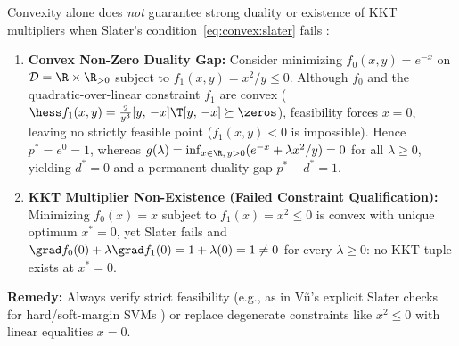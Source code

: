 \documentclass[../../../../master.tex]{subfiles}
\begin{document}
\begin{pitfall}
Convexity alone does \emph{not} guarantee strong duality or existence of KKT multipliers when Slater's condition~\eqref{eq:convex:slater} fails :
\begin{enumerate}[leftmargin=1.4em, itemsep=2pt, topsep=2pt]
  \item \textbf{Convex Non-Zero Duality Gap:} Consider minimizing $f_0(x, y) = e^{-x}$ on $\mathcal{D} = \R \times \R_{>0}$ subject to $f_1(x, y) = x^2 / y \le 0$. Although $f_0$ and the quadratic-over-linear constraint $f_1$ are convex ($\hess f_1(x,y) = \frac{2}{y^3}[y,\, -x]\T[y,\, -x] \succeq \zeros$), feasibility forces $x = 0$, leaving no strictly feasible point ($f_1(x, y) < 0$ is impossible). Hence $p^* = e^0 = 1$, whereas $g(\lambda) = \inf_{x \in \R,\, y > 0} (e^{-x} + \lambda x^2/y) = 0$ for all $\lambda \ge 0$, yielding $d^* = 0$ and a permanent duality gap $p^* - d^* = 1$.
  \item \textbf{KKT Multiplier Non-Existence (Failed Constraint Qualification):} Minimizing $f_0(x) = x$ subject to $f_1(x) = x^2 \le 0$ is convex with unique optimum $x^* = 0$, yet Slater fails and $\grad f_0(0) + \lambda \grad f_1(0) = 1 + \lambda(0) = 1 \neq 0$ for every $\lambda \ge 0$: no KKT tuple exists at $x^* = 0$.
\end{enumerate}
\textbf{Remedy:} Always verify strict feasibility (e.g., as in V\~{u}'s explicit Slater checks for hard/soft-margin SVMs ) or replace degenerate constraints like $x^2 \le 0$ with linear equalities $x = 0$.
\end{pitfall}
\end{document}

